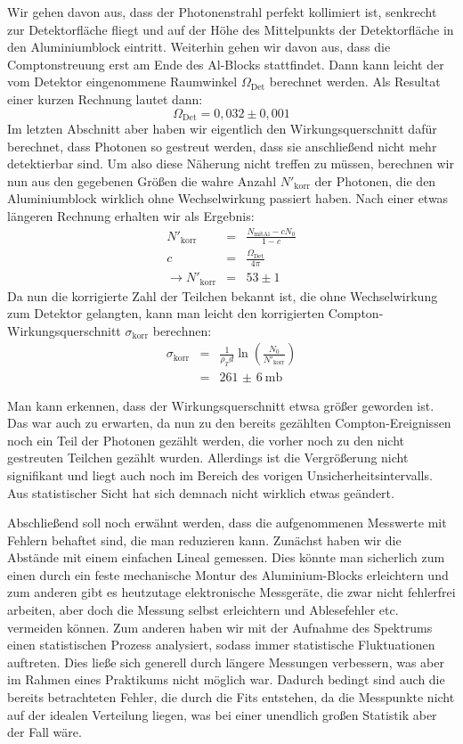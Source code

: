 Wir gehen davon aus, dass der Photonenstrahl perfekt kollimiert ist, senkrecht
zur Detektorfläche fliegt und auf der Höhe des Mittelpunkts der Detektorfläche
in den Aluminiumblock eintritt. Weiterhin gehen wir davon aus, dass die
Comptonstreuung erst am Ende des Al-Blocks stattfindet. Dann kann leicht der vom
Detektor eingenommene Raumwinkel $\Omega_{\mathrm{Det}}$ berechnet werden. Als
Resultat einer kurzen Rechnung lautet dann:
\begin{equation}
\Omega_{\mathrm{Det}} = 0,032 \pm 0,001
\end{equation}
Im letzten Abschnitt aber haben wir eigentlich den Wirkungsquerschnitt dafür
berechnet, dass Photonen so gestreut werden, dass sie anschließend nicht mehr
detektierbar sind. Um also diese Näherung nicht treffen zu müssen, berechnen wir
nun aus den gegebenen Größen die wahre Anzahl $N'_{\mathrm{korr}}$ der Photonen,
die den Aluminiumblock wirklich ohne Wechselwirkung passiert haben. Nach einer
etwas längeren Rechnung erhalten wir als Ergebnis:
\begin{eqnarray}
N'_{\mathrm{korr}} &=& \frac{N_{\mathrm{mit Al}}-cN_0}{1-c}\\
c &=& \frac{\Omega_{\mathrm{Det}}}{4\pi}\\
\rightarrow N'_{\mathrm{korr}} &=& 53 \pm 1
\end{eqnarray}
Da nun die korrigierte Zahl der Teilchen bekannt ist, die ohne Wechselwirkung
zum Detektor gelangten, kann man leicht den korrigierten
Compton-Wirkungsquerschnitt $\sigma_{\mathrm{korr}}$ berechnen:
\begin{eqnarray}
\sigma_{\mathrm{korr}} &=& \frac{1}{\rho_T
d}\ln\left(\frac{N_0}{N'_{\mathrm{korr}}}\right)\\
&=& \SI{261(6)}{\milli\barn}
\end{eqnarray}

Man kann erkennen, dass der Wirkungsquerschnitt etwsa größer geworden ist. Das war
auch zu erwarten, da nun zu den bereits gezählten Compton-Ereignissen noch ein Teil
der Photonen gezählt werden, die vorher noch zu den nicht gestreuten Teilchen gezählt
wurden. Allerdings ist die Vergrößerung nicht signifikant und liegt auch
noch im Bereich des vorigen Unsicherheitsintervalls. Aus statistischer Sicht hat sich
demnach nicht wirklich etwas geändert.

Abschließend soll noch erwähnt werden, dass die aufgenommenen Messwerte mit Fehlern
behaftet sind, die man reduzieren kann. Zunächst haben wir die Abstände mit einem einfachen
Lineal gemessen. Dies könnte man sicherlich zum einen durch ein feste mechanische Montur
des Aluminium-Blocks erleichtern und zum anderen gibt es heutzutage elektronische
Messgeräte, die zwar nicht fehlerfrei arbeiten, aber doch die Messung selbst erleichtern
und Ablesefehler etc. vermeiden können. Zum anderen haben wir mit der Aufnahme des
Spektrums einen statistischen Prozess analysiert, sodass immer statistische Fluktuationen
auftreten. Dies ließe sich generell durch längere Messungen verbessern, was aber im
Rahmen eines Praktikums nicht möglich war. Dadurch bedingt sind auch die bereits betrachteten
Fehler, die durch die Fits entstehen, da die Messpunkte nicht auf der idealen
Verteilung liegen, was bei einer unendlich großen Statistik aber der Fall wäre.

